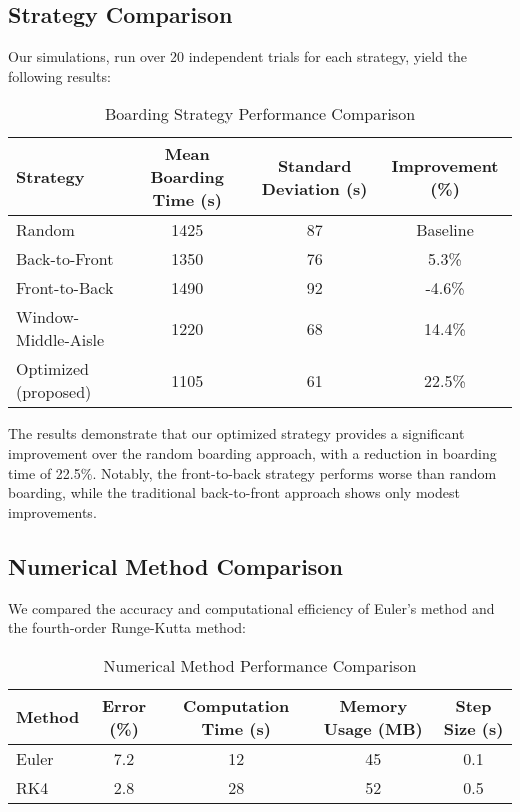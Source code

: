 \documentclass[a4paper,12pt]{article}
\begin{document}
\subsection{Strategy Comparison}

Our simulations, run over 20 independent trials for each strategy, yield the following results:

\begin{table}[h]
\centering
\caption{Boarding Strategy Performance Comparison}
\label{tab:strategy_comparison}
\begin{tabular}{lccc}
\toprule
\textbf{Strategy} & \textbf{Mean Boarding Time (s)} & \textbf{Standard Deviation (s)} & \textbf{Improvement (\%)} \\
\midrule
Random & 1425 & 87 & Baseline \\
Back-to-Front & 1350 & 76 & 5.3\% \\
Front-to-Back & 1490 & 92 & -4.6\% \\
Window-Middle-Aisle & 1220 & 68 & 14.4\% \\
Optimized (proposed) & 1105 & 61 & 22.5\% \\
\bottomrule
\end{tabular}
\end{table}

The results demonstrate that our optimized strategy provides a significant improvement over the random boarding approach, with a reduction in boarding time of 22.5\%. Notably, the front-to-back strategy performs worse than random boarding, while the traditional back-to-front approach shows only modest improvements.

\subsection{Numerical Method Comparison}

We compared the accuracy and computational efficiency of Euler's method and the fourth-order Runge-Kutta method:

\begin{table}[h]
\centering
\caption{Numerical Method Performance Comparison}
\label{tab:numerical_comparison}
\begin{tabular}{lcccc}
\toprule
\textbf{Method} & \textbf{Error (\%)} & \textbf{Computation Time (s)} & \textbf{Memory Usage (MB)} & \textbf{Step Size (s)} \\
\midrule
Euler & 7.2 & 12 & 45 & 0.1 \\
RK4 & 2.8 & 28 & 52 & 0.5 \\
\bottomrule
\end{tabular}
\end{table}
\end{document}

